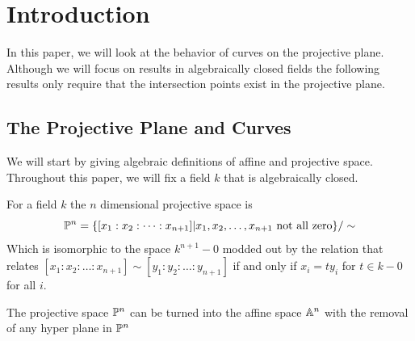 \section{Introduction}
In this paper, we will look at the behavior of curves on the projective plane. Although we will focus on results in algebraically closed fields the following results only require that the intersection points exist in the projective plane.

\subsection{The Projective Plane and Curves}
We will start by giving algebraic definitions of affine and projective space. Throughout this paper, we will fix a field $k$ that is algebraically closed.
\begin{definition}
For a field $k$ the $n$ dimensional projective space is 
$$\P^n=\{[x_1:x_2:\dots:x_{n+1}]|x_1,x_2,\dots,x_{n+1}\text{ not all zero}\}/\sim$$
Which is isomorphic to the space $k^{n+1}-0$ modded out by the relation that relates $[x_1:x_2:\dots:x_{n+1}]\sim [y_1:y_2:\dots:y_{n+1}]$ if and only if $x_i=ty_i$ for $t\in k-0$ for all $i$.
\end{definition}
\begin{prop}
\label{prop:affine_def}
    The projective space $\P^n$ can be turned into the affine space $\A^n$ with the removal of any hyper plane in $\P^n$
\end{prop}

